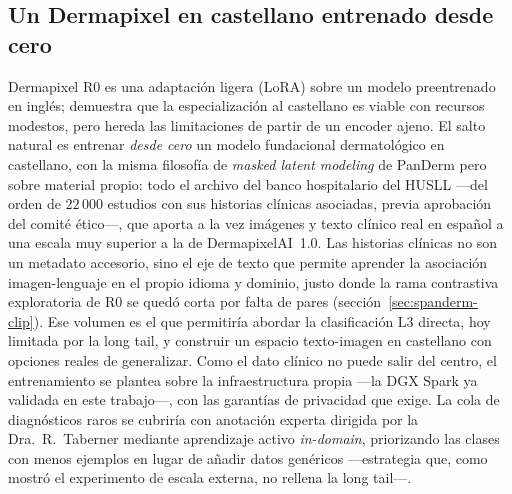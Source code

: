 \subsection{Un Dermapixel en castellano entrenado desde cero}
\label{sec:dermapixel-futuro}
Dermapixel R0 es una adaptación ligera (LoRA) sobre un modelo preentrenado
en inglés; demuestra que la especialización al castellano es viable con
recursos modestos, pero hereda las limitaciones de partir de un encoder
ajeno. El salto natural es entrenar \emph{desde cero} un modelo
fundacional dermatológico en castellano, con la misma filosofía de
\emph{masked latent modeling} de PanDerm pero sobre material propio: todo
el archivo del banco hospitalario del HUSLL ---del orden de $22\,000$
estudios con sus historias clínicas asociadas, previa aprobación del
comité ético---, que aporta a la vez imágenes y texto clínico real en
español a una escala muy superior a la de DermapixelAI~1.0. Las historias
clínicas no son un metadato accesorio, sino el eje de texto que permite
aprender la asociación imagen-lenguaje en el propio idioma y dominio, justo
donde la rama contrastiva exploratoria de R0 se quedó corta por falta de
pares (sección~\ref{sec:spanderm-clip}). Ese volumen es el que permitiría
abordar la clasificación L3 directa, hoy limitada por la long tail, y
construir un espacio texto-imagen en castellano con opciones reales de
generalizar. Como el dato clínico no puede salir del centro, el
entrenamiento se plantea sobre la infraestructura propia ---la DGX Spark ya
validada en este trabajo---, con las garantías de privacidad que exige.
La cola de diagnósticos raros se cubriría con anotación experta dirigida
por la Dra.~R.~Taberner mediante aprendizaje activo
\emph{in-domain}\label{sec:linea-active-learning}, priorizando las clases
con menos ejemplos en lugar de añadir datos genéricos ---estrategia que,
como mostró el experimento de escala externa, no rellena la long tail---.

